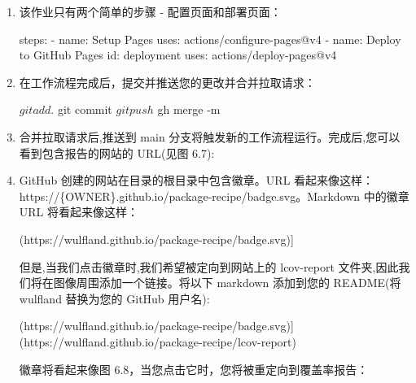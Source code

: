 \begin{enumerate}

\item 
该作业只有两个简单的步骤 - 配置页面和部署页面：

\begin{shell}
steps:
  - name: Setup Pages
    uses: actions/configure-pages@v4
  - name: Deploy to GitHub Pages
    id: deployment
    uses: actions/deploy-pages@v4
\end{shell}

\item 
在工作流程完成后，提交并推送您的更改并合并拉取请求：

\begin{shell}
$ git add .
$ git commit
$ git push
$ gh merge -m
\end{shell}

\item 
合并拉取请求后,推送到 main 分支将触发新的工作流程运行。完成后,您可以看到包含报告的网站的 URL(见图 6.7):


\item 
GitHub 创建的网站在目录的根目录中包含徽章。URL 看起来像这样：https://\{OWNER\}.github.io/package-recipe/badge.svg。Markdown 中的徽章 URL 将看起来像这样：

\begin{shell}
[![Coverage](https://wulfland.github.io/package-recipe/badge.svg)]
\end{shell}

但是,当我们点击徽章时,我们希望被定向到网站上的 lcov-report 文件夹,因此我们将在图像周围添加一个链接。将以下 markdown 添加到您的 README(将 wulfland 替换为您的 GitHub 用户名):

\begin{shell}
[![Coverage](https://wulfland.github.io/package-recipe/badge.svg)](https://wulfland.github.io/package-recipe/lcov-report)
\end{shell}

徽章将看起来像图 6.8，当您点击它时，您将被重定向到覆盖率报告：

  
\end{enumerate}


